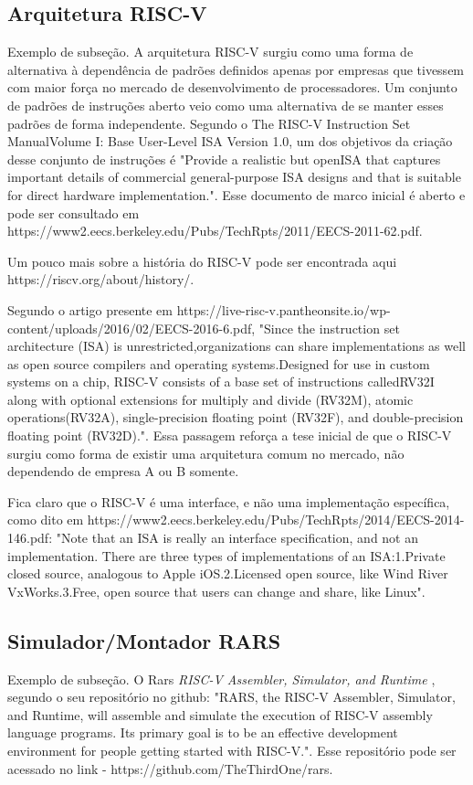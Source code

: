 \documentclass[a4paper]{sbgames}
\begin{document}
\subsection{Arquitetura RISC-V}{
\label{sec:MIPS}

Exemplo de subseção. A arquitetura RISC-V \cite{patterson2005organizaccao} surgiu como uma forma de alternativa à dependência de padrões definidos apenas por empresas que tivessem com maior força no mercado de desenvolvimento de processadores. Um conjunto de padrões de instruções aberto veio como uma alternativa de se manter esses padrões de forma independente. Segundo o The RISC-V Instruction Set ManualVolume I: Base User-Level ISA Version 1.0, um dos objetivos da criação desse conjunto de instruções é "Provide  a realistic but openISA  that  captures  important  details  of  commercial  general-purpose ISA designs and that is suitable for direct hardware implementation.". Esse documento de marco inicial é aberto e pode ser consultado em https://www2.eecs.berkeley.edu/Pubs/TechRpts/2011/EECS-2011-62.pdf.

Um pouco mais sobre a história do RISC-V pode ser encontrada aqui https://riscv.org/about/history/.

Segundo o artigo presente em https://live-risc-v.pantheonsite.io/wp-content/uploads/2016/02/EECS-2016-6.pdf, "Since the instruction set architecture (ISA) is unrestricted,organizations can share implementations as well as open source compilers and operating systems.Designed for use in custom systems on a chip, RISC-V consists of a base set of instructions calledRV32I along with optional extensions for multiply and divide (RV32M), atomic operations(RV32A), single-precision floating point (RV32F), and double-precision floating point (RV32D).". Essa passagem reforça a tese inicial de que o RISC-V surgiu como forma de existir uma arquitetura comum no mercado, não dependendo de empresa A ou B somente.
 
Fica claro que o RISC-V é uma interface, e não uma implementação específica, como dito em https://www2.eecs.berkeley.edu/Pubs/TechRpts/2014/EECS-2014-146.pdf: "Note that an ISA is really an interface specification, and not an implementation. There are three types of implementations of an ISA:1.Private closed source, analogous to Apple iOS.2.Licensed open source, like Wind River VxWorks.3.Free, open source that users can change and share, like Linux".

}


\subsection{Simulador/Montador RARS}{
\label{sec:Rars}
Exemplo de subseção. O Rars \textit{RISC-V Assembler, Simulator, and Runtime} \cite{Mars1}, segundo o seu repositório no github: "RARS, the RISC-V Assembler, Simulator, and Runtime, will assemble and simulate the execution of RISC-V assembly language programs. Its primary goal is to be an effective development environment for people getting started with RISC-V.". Esse repositório pode ser acessado no link - https://github.com/TheThirdOne/rars.

}
\end{document}
